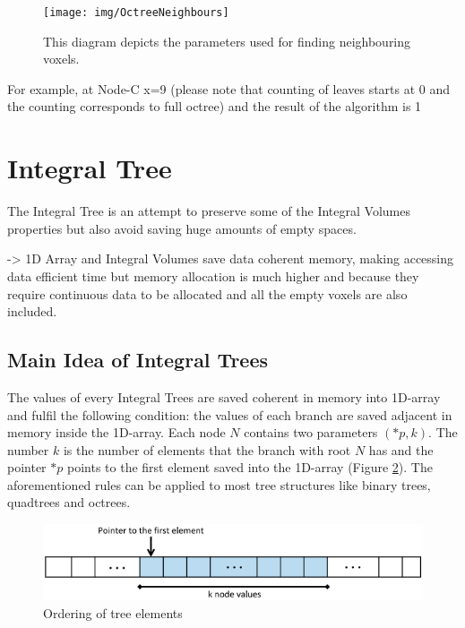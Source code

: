 \documentclass{subfiles}
\begin{document}
\begin{figure}[!htbp]
	\centering
	\texttt{[image: img/OctreeNeighbours]}
	\caption{This diagram depicts the parameters used for finding neighbouring voxels.}
	\label{fig:OctreeNeighbours}
\end{figure}


\par For example, at Node-C x=9 (please note that counting of leaves starts at 0 and the counting corresponds to full octree) and the result of the algorithm is 1




\newpage

\section{Integral Tree}\label{sec:ITopt}
\par The Integral Tree is an attempt to preserve some of the Integral Volumes properties but also avoid saving huge amounts of empty spaces.  

-> 1D Array and Integral Volumes save data coherent memory, making accessing data efficient time but memory allocation is much higher and because they require continuous data to be allocated and all the empty voxels are also included. 

\subsection{Main Idea of Integral Trees}

\par The values of every Integral Trees are saved coherent in memory into 1D-array and fulfil the following condition: the values of each branch are saved adjacent in memory inside the 1D-array. Each node $N$ contains two parameters $(*p, k)$. The number $k$ is the number of elements that the branch with root $N$ has and the pointer $*p$ points to the first element saved into the 1D-array (Figure \ref{fig:IntegralTreeMainIdea}). The aforementioned rules can be applied to most tree structures like binary trees, quadtrees and octrees. 

\begin{figure}[!htbp]
	\centering
	\includegraphics[width=5.5in]{img/IntegralTreeMainIdea}
	\caption{Ordering of tree elements}
	\label{fig:IntegralTreeMainIdea}
\end{figure}
\end{document}
